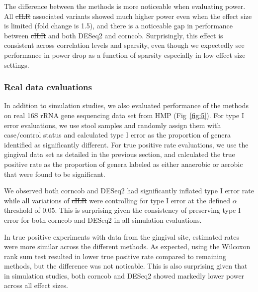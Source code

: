 \documentclass[10pt,letterpaper]{article}
\providecommand{\DIFaddtex}[1]{{\protect\color{blue}\uwave{#1}}} %
\providecommand{\DIFdeltex}[1]{{\protect\color{red}\sout{#1}}}                      %
\providecommand{\DIFaddbegin}{} %
\providecommand{\DIFaddend}{} %
\providecommand{\DIFdelbegin}{} %
\providecommand{\DIFdelend}{} %
\providecommand{\DIFadd}[1]{\texorpdfstring{\DIFaddtex{#1}}{#1}} %
\providecommand{\DIFdel}[1]{\texorpdfstring{\DIFdeltex{#1}}{}} %
\newcommand{\DIFscaledelfig}{0.5}
\newlength{\DIFdelgraphicswidth} %
\newlength{\DIFdelgraphicsheight} %
\newcommand{\DIFaddincludegraphics}[2][]{{\color{blue}\fbox{\DIFOincludegraphics[#1]{#2}}}} %
\newcommand{\DIFdelincludegraphics}[2][]{%
\sbox{\DIFdelgraphicsbox}{\DIFOincludegraphics[#1]{#2}}%
\settoboxwidth{\DIFdelgraphicswidth}{\DIFdelgraphicsbox} %
\settoboxtotalheight{\DIFdelgraphicsheight}{\DIFdelgraphicsbox} %
\scalebox{\DIFscaledelfig}{%
\parbox[b]{\DIFdelgraphicswidth}{\usebox{\DIFdelgraphicsbox}\\[-\baselineskip] \rule{\DIFdelgraphicswidth}{0em}}\llap{\resizebox{\DIFdelgraphicswidth}{\DIFdelgraphicsheight}{%
\setlength{\unitlength}{\DIFdelgraphicswidth}%
\begin{picture}(1,1)%
\thicklines\linethickness{2pt} %
{\color[rgb]{1,0,0}\put(0,0){\framebox(1,1){}}}%
{\color[rgb]{1,0,0}\put(0,0){\line( 1,1){1}}}%
{\color[rgb]{1,0,0}\put(0,1){\line(1,-1){1}}}%
\end{picture}%
}\hspace*{3pt}}} %
} %
\DeclareRobustCommand{\DIFaddbegin}{\DIFOaddbegin \let\includegraphics\DIFaddincludegraphics} %
\DeclareRobustCommand{\DIFaddend}{\DIFOaddend \let\includegraphics\DIFOincludegraphics} %
\DeclareRobustCommand{\DIFdelbegin}{\DIFOdelbegin \let\includegraphics\DIFdelincludegraphics} %
\DeclareRobustCommand{\DIFdelend}{\DIFOaddend \let\includegraphics\DIFOincludegraphics} %
\begin{document}
The difference between the methods is more noticeable when evaluating power. All \DIFdelbegin \DIFdel{cILR }\DIFdelend \DIFaddbegin \DIFadd{CBEA }\DIFaddend associated variants showed much higher power even when the effect size is limited (fold change is 1.5), and there is a noticeable gap in performance between \DIFdelbegin \DIFdel{cILR }\DIFdelend \DIFaddbegin \DIFadd{CBEA }\DIFaddend and both DESeq2 and corncob. Surprisingly, this effect is consistent across correlation levels and sparsity, even though we expectedly see performance in power drop as a function of sparsity especially in low effect size settings.  

\subsubsection*{Real data evaluations}
In addition to simulation studies, we also evaluated performance of the methods on real 16S rRNA gene sequencing data set from HMP (Fig~\ref{fig:5}). For type I error evaluations, we use stool samples and randomly assign them with case/control status and calculated type I error as the proportion of genera identified as significantly different. For true positive rate evaluations, we use the gingival data set as detailed in the previous section, and calculated the true positive rate as the proportion of genera labeled as either anaerobic or aerobic that were found to be significant.   

We observed both corncob and DESeq2 had significantly inflated type I error rate while all variations of \DIFdelbegin \DIFdel{cILR }\DIFdelend \DIFaddbegin \DIFadd{CBEA }\DIFaddend were controlling for type I error at the defined $\alpha$ threshold of 0.05. This is surprising given the consistency of preserving type I error for both corncob and DESeq2 in all simulation evaluations. 

In true positive experiments with data from the gingival site, estimated rates were more similar across the different methods. As expected, using the Wilcoxon rank sum test resulted in lower true positive rate compared to remaining methods, but the difference was not noticable. This is also surprising given that in simulation studies, both corncob and DESeq2 showed markedly lower power across all effect sizes.  
\end{document}

